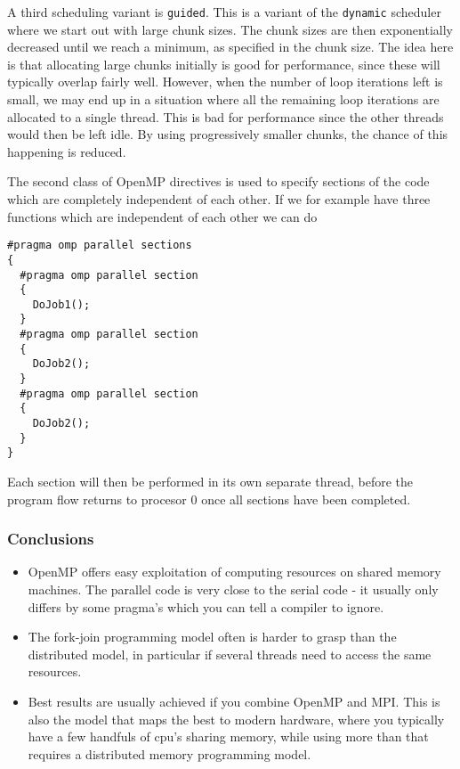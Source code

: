 A third scheduling variant is \texttt{guided}. This is a variant of the \texttt{dynamic} scheduler where we start out with large chunk sizes. The chunk sizes are then exponentially decreased until we reach a minimum, as specified in the chunk size. The idea here is that allocating large chunks initially is good for performance, since these will typically overlap fairly well. However, when the number of loop iterations left is small, we may end up in a situation where all the remaining loop iterations are allocated to a single thread. This is bad for performance since the other threads would then be left idle. By using progressively smaller chunks, the chance of this happening is reduced.

The second class of OpenMP directives is used to specify sections of the code which are completely independent of each other. If we for example have three functions which are independent of each other we can do
\begin{lstlisting}
#pragma omp parallel sections
{
  #pragma omp parallel section
  {
    DoJob1();
  }
  #pragma omp parallel section
  {
    DoJob2();
  }
  #pragma omp parallel section
  {
    DoJob2();
  }
}
\end{lstlisting}
Each section will then be performed in its own separate thread, before the program flow returns to procesor 0 once all sections have been completed.

\subsubsection{Conclusions} %
\label{ssub:conclusions}
\begin{itemize}
  \item OpenMP offers easy exploitation of computing resources on shared memory machines. The parallel code is very close to the serial code - it usually only differs by some pragma's which you can tell a compiler to ignore.
  \item The fork-join programming model often is harder to grasp than the distributed model, in particular if several threads need to access the same resources.
  \item Best results are usually achieved if you combine OpenMP and MPI. This is also the model that maps the best to modern hardware, where you typically have a few handfuls of cpu's sharing memory, while using more than that requires a distributed memory programming model.
\end{itemize}



